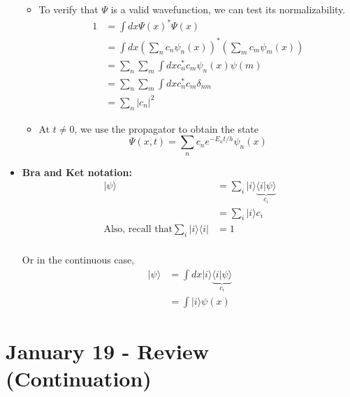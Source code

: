 \documentclass{article}
\newcommand{\ket}[1]{|#1 \rangle}
\newcommand{\bra}[1]{\langle #1|}
\newcommand{\inner}[2]{\langle #1 | #2 \rangle}
\begin{document}
\begin{itemize}
\begin{itemize}
        \item To verify that $\Psi$ is a valid wavefunction, we can test its normalizability.
        \begin{align*}
          1 &= \int dx \Psi(x)^{*} \Psi(x) \\
          &= \int dx \left( \sum_n c_n \psi_n(x) \right)^{*} \left( \sum_m c_m \psi_m(x) \right) \\
          &= \sum_n \sum_m \int dx c_n^{*} c_m \psi_n(x) \psi(m) \\
          &= \sum_n \sum_m \int dx c_n^{*} c_m \delta_{nm} \\
          &= \sum_n |c_n|^2
        \end{align*}

        \item At $t \neq 0$, we use the propagator to obtain the state 
        \[  \Psi(x, t) = \sum_n c_n e^{-E_n t / h} \psi_n(x)  \]
      \end{itemize}

  \item \textbf{Bra and Ket notation:} 
  \begin{align*}
    \ket{\psi} &= \sum_i \ket{i} \underbrace{\inner{i}{\psi}}_{c_i} \\
    &= \sum_i \ket{i} c_i \\
    \text{Also, recall that} \sum_i \ket{i}\bra{i} &= 1 \\
  \end{align*}

  Or in the continuous case, 
  \begin{align*}
    \ket{\psi} &= \int dx \ket{i} \underbrace{\inner{i}{\psi}}_{c_i} \\
    &= \int \ket{i} \psi(x)
  \end{align*}

\end{itemize}

\pagebreak

\section{January 19 - Review (Continuation)}
\end{document}
